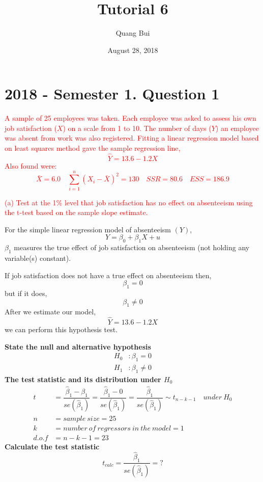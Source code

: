 \documentclass[12pt]{report}
\title{Tutorial 6}
\subtitle
{
\textbf{keywords}: hypothesis testing, t-test, test statistic, critical value, confidence intervals, R-squared, interpretation of coefficients, multiple linear regression, omitted variable bias

\textbf{estimated reading time}: 33 minutes
}
\author{Quang Bui}
\date{August 28, 2018}
\begin{document}
\maketitle

\section*{2018 - Semester 1. Question 1}
\noindent \textcolor{red}{A sample of 25 employees was taken. Each employee was asked to assess his own job satisfaction ($X$) on a scale from 1 to 10. The number of days ($Y$) an employee was absent from work was also registered. Fitting a linear regression model based on least squares method gave the sample regression line, $$\hat{Y} = 13.6 - 1.2X$$ Also found were: $$\bar{X} = 6.0 \quad \sum_{i=1}^{n}(X_i - \bar{X})^2=130 \quad SSR = 80.6 \quad ESS = 186.9$$}

\noindent \textcolor{red}{(a) Test at the 1\% level that job satisfaction has no effect on absenteeism using the t-test based on the sample slope estimate.}

\noindent For the simple linear regression model of absenteeism $(Y)$, $$Y = \beta_0 + \beta_1 X + u$$ $\beta_1$ measures the true effect of job satisfaction on absenteeism (not holding any variable(s) constant). 

\noindent If job satisfaction does not have a true effect on absenteeism then, $$\beta_1 = 0$$ but if it does,  $$\beta_1 \neq 0$$ After we estimate our model, $$\hat{Y} = 13.6 - 1.2X$$ we can perform this hypothesis test.

\noindent \textbf{State the null and alternative hypothesis}
\begin{align*}
H_0&: \beta_1 = 0 \\
H_1&: \beta_1 \neq 0
\end{align*}
\noindent \textbf{The test statistic and its distribution under $H_0$}
\begin{align*}
t &= \dfrac{\hat{\beta}_1 - \beta_1}{se(\hat{\beta}_1)} = \dfrac{\hat{\beta}_1 - 0}{se(\hat{\beta}_1)} = \dfrac{\hat{\beta}_1}{se(\hat{\beta}_1)} \sim t_{n-k-1} \quad under\ H_0 \\
n &= sample\ size = 25 \\
k &= number\ of\ regressors\ in\ the\ model = 1 \\
d.o.f &= n-k-1=23
\end{align*}
\noindent \textbf{Calculate the test statistic}
$$t_{calc} = \dfrac{\hat{\beta}_1}{se(\hat{\beta}_1)} = ? $$
\end{document}
